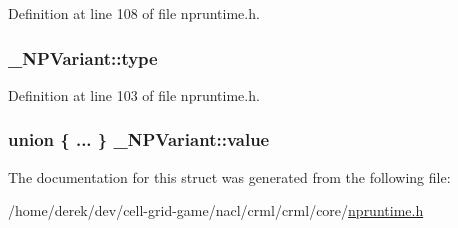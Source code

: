 Definition at line 108 of file npruntime.h.

\hypertarget{struct___n_p_variant_a70be375a4c0bb8071628ad21682e3f70}{
\subsubsection[{type}]{ {\bf \_\-NPVariant::type}}}
\label{struct___n_p_variant_a70be375a4c0bb8071628ad21682e3f70}


Definition at line 103 of file npruntime.h.

\hypertarget{struct___n_p_variant_a4b26515a9d3d12fced174514d8fcc39f}{
\subsubsection[{value}]{\setlength{\rightskip}{0pt plus 5cm}union \{ ... \}   {\bf \_\-NPVariant::value}}}
\label{struct___n_p_variant_a4b26515a9d3d12fced174514d8fcc39f}


The documentation for this struct was generated from the following file:\begin{DoxyCompactItemize}
\item 
/home/derek/dev/cell-\/grid-\/game/nacl/crml/crml/core/\hyperlink{npruntime_8h}{npruntime.h}\end{DoxyCompactItemize}

